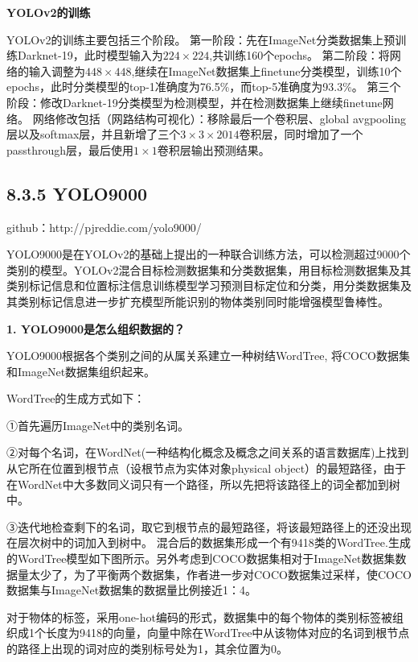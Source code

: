 \textbf{YOLOv2的训练}

YOLOv2的训练主要包括三个阶段。
第一阶段：先在ImageNet分类数据集上预训练Darknet-19，此时模型输入为\(224\times 224\),共训练160个epochs。
第二阶段：将网络的输入调整为\(448\times 448\),继续在ImageNet数据集上finetune分类模型，训练10个epochs，此时分类模型的top-1准确度为76.5\%，而top-5准确度为93.3\%。
第三个阶段：修改Darknet-19分类模型为检测模型，并在检测数据集上继续finetune网络。
网络修改包括（网路结构可视化）：移除最后一个卷积层、global
avgpooling层以及softmax层，并且新增了三个\(3\times 3 \times 2014\)卷积层，同时增加了一个passthrough层，最后使用\(1\times 1\)卷积层输出预测结果。

\subsection{8.3.5 YOLO9000}\label{yolo9000}

github：http://pjreddie.com/yolo9000/

YOLO9000是在YOLOv2的基础上提出的一种联合训练方法，可以检测超过9000个类别的模型。YOLOv2混合目标检测数据集和分类数据集，用目标检测数据集及其类别标记信息和位置标注信息训练模型学习预测目标定位和分类，用分类数据集及其类别标记信息进一步扩充模型所能识别的物体类别同时能增强模型鲁棒性。

\textbf{1. YOLO9000是怎么组织数据的？}

YOLO9000根据各个类别之间的从属关系建立一种树结WordTree,
将COCO数据集和ImageNet数据集组织起来。

WordTree的生成方式如下：

①首先遍历ImageNet中的类别名词。

②对每个名词，在WordNet(一种结构化概念及概念之间关系的语言数据库)上找到从它所在位置到根节点（设根节点为实体对象physical
object）的最短路径，由于在WordNet中大多数同义词只有一个路径，所以先把将该路径上的词全都加到树中。

③迭代地检查剩下的名词，取它到根节点的最短路径，将该最短路径上的还没出现在层次树中的词加入到树中。
混合后的数据集形成一个有9418类的WordTree.生成的WordTree模型如下图所示。另外考虑到COCO数据集相对于ImageNet数据集数据量太少了，为了平衡两个数据集，作者进一步对COCO数据集过采样，使COCO数据集与ImageNet数据集的数据量比例接近1：4。

\begin{figure}
\centering
\caption{}
\end{figure}

对于物体的标签，采用one-hot编码的形式，数据集中的每个物体的类别标签被组织成1个长度为9418的向量，向量中除在WordTree中从该物体对应的名词到根节点的路径上出现的词对应的类别标号处为1，其余位置为0。

